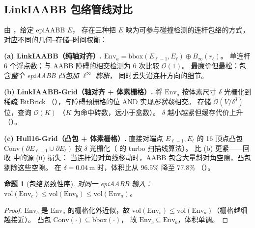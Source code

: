 \documentclass[journal]{IEEEtran}
\newtheorem{proposition}{命题}
\begin{document}
\subsection{LinkIAABB 包络管线对比}\label{sec:envelope_compare}

由 ，给定 epiAABB $E$，
存在三种把 $E$ 映为可参与碰撞检测的连杆包络的方式，
对应不同的几何--存储--时间权衡：

\textbf{(a) LinkIAABB（纯轴对齐）.}
$\mathrm{Env}_a=\mathrm{bbox}(E_{\ell-1},E_\ell)\oplus B_\infty(r_\ell)$。
单连杆 6 个浮点数；与 AABB 障碍的相交检测为
6 次比较 $\mathcal{O}(1)$。
最廉价但最松：包含\emph{整个 epiAABB 凸包加 $\ell^\infty$ 膨胀}，
同时丢失沿连杆方向的细节。

\textbf{(b) LinkIAABB-Grid（轴对齐 + 体素栅格）.}
将 $\mathrm{Env}_a$ 按体素尺寸 $\delta$ 光栅化到稀疏 BitBrick
（），与障碍预栅格的位 AND 实现\emph{形状级}相交。
存储 $\mathcal{O}(V/\delta^3)$ 位，查询 $\mathcal{O}(K)$
（$K$ 为命中砖数，远小于盒数）。
$\delta$ 越小越紧但缓存代价上升（）。

\textbf{(c) Hull16-Grid（凸包 + 体素栅格）.}
直接对端点 $E_{\ell-1},E_\ell$ 的 16 顶点凸包
$\mathrm{Conv}(\partial E_{\ell-1}\cup\partial E_\ell)$
按 $\delta$ 光栅化（ 的 turbo 扫描线算法）。
比 (b) 更紧——回收  中的源 (ii) 损失：
当连杆沿对角线移动时，AABB 包含大量斜对角空隙，凸包剔除这些空隙。
在 $\delta=0.04$\,m 时，体积比从 $96.5\%$ 降至 $77.8\%$
（）。

\begin{proposition}[包络紧致性序]\label{prop:env_order}
对同一 epiAABB 输入：
$\mathrm{vol}(\mathrm{Env}_c)
\leq\mathrm{vol}(\mathrm{Env}_b)
\leq\mathrm{vol}(\mathrm{Env}_a)$。
\end{proposition}

\begin{proof}
$\mathrm{Env}_b$ 是 $\mathrm{Env}_a$ 的栅格化外近似，故
$\mathrm{vol}(\mathrm{Env}_b)\leq\mathrm{vol}(\mathrm{Env}_a)$（栅格越细越接近）。
凸包 $\mathrm{Conv}(\cdot)\subseteq\mathrm{bbox}(\cdot)$，
故 $\mathrm{Env}_c\subseteq\mathrm{Env}_b$，体积单调。
\end{proof}

\begin{table}[ht]
\centering
\caption{LinkIAABB 包络管线设计权衡}
\label{tab:env_compare}
\end{table}
\end{document}

